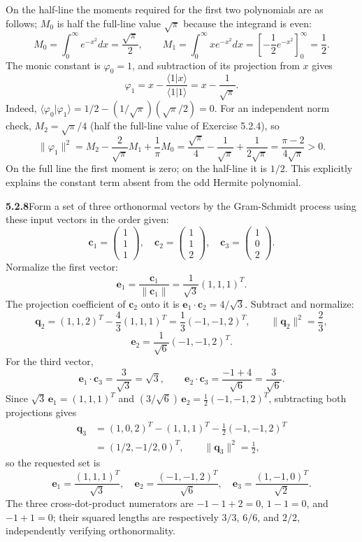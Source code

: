 On the half-line the moments required for the first two polynomials are
as follows; $M_0$ is half the full-line value $\sqrt\pi$ because the
integrand is even:
\[
M_0=\int_0^\infty e^{-x^2}dx=\frac{\sqrt\pi}{2},\qquad
M_1=\int_0^\infty xe^{-x^2}dx
=\left[-\frac12e^{-x^2}\right]_0^\infty=\frac12.
\]
The monic constant is $\varphi_0=1$, and subtraction of its projection
from $x$ gives
\[
\boxed{\varphi_1=x-\frac{\langle1|x\rangle}{\langle1|1\rangle}
=x-\frac1{\sqrt\pi}}.
\]
Indeed, $\langle\varphi_0|\varphi_1\rangle
=1/2-(1/\sqrt\pi)(\sqrt\pi/2)=0$.
For an independent norm check, $M_2=\sqrt\pi/4$ (half the full-line
value of Exercise 5.2.4), so
\[
\|\varphi_1\|^2=M_2-\frac2{\sqrt\pi}M_1+\frac1\pi M_0
=\frac{\sqrt\pi}4-\frac1{\sqrt\pi}+\frac1{2\sqrt\pi}
=\frac{\pi-2}{4\sqrt\pi}>0.
\]
On the full line the first moment is zero; on the half-line it is $1/2$.
This explicitly explains the constant term absent from the odd Hermite
polynomial.

\par\bigskip
\noindent\textbf{5.2.8}\quad Form a set of three orthonormal vectors by the
Gram-Schmidt process using these input vectors in the order given:
\[
\mathbf{c}_{1}=\begin{pmatrix}1\\1\\1\end{pmatrix},\quad
\mathbf{c}_{2}=\begin{pmatrix}1\\1\\2\end{pmatrix},\quad
\mathbf{c}_{3}=\begin{pmatrix}1\\0\\2\end{pmatrix}.
\]
\solution
Normalize the first vector:
\[
\mathbf e_1=\frac{\mathbf c_1}{\|\mathbf c_1\|}
=\frac1{\sqrt3}(1,1,1)^T.
\]
The projection coefficient of $\mathbf c_2$ onto it is
$\mathbf e_1\cdot\mathbf c_2=4/\sqrt3$. Subtract and normalize:
\[
\mathbf q_2=(1,1,2)^T-\frac43(1,1,1)^T
=\frac13(-1,-1,2)^T,\qquad \|\mathbf q_2\|^2=\frac23,
\]
\[
\mathbf e_2=\frac1{\sqrt6}(-1,-1,2)^T.
\]
For the third vector,
\[
\mathbf e_1\cdot\mathbf c_3=\frac3{\sqrt3}=\sqrt3,
\qquad
\mathbf e_2\cdot\mathbf c_3=\frac{-1+4}{\sqrt6}=\frac3{\sqrt6}.
\]
Since $\sqrt3\,\mathbf e_1=(1,1,1)^T$ and
$(3/\sqrt6)\,\mathbf e_2=\frac12(-1,-1,2)^T$, subtracting both
projections gives
\begin{align*}
\mathbf q_3&=(1,0,2)^T-(1,1,1)^T
 -\frac12(-1,-1,2)^T\\
&=(1/2,-1/2,0)^T,\qquad \|\mathbf q_3\|^2=\frac12,
\end{align*}
so the requested set is
\[
\boxed{\mathbf e_1=\frac{(1,1,1)^T}{\sqrt3},\quad
\mathbf e_2=\frac{(-1,-1,2)^T}{\sqrt6},\quad
\mathbf e_3=\frac{(1,-1,0)^T}{\sqrt2}}.
\]
The three cross-dot-product numerators are $-1-1+2=0$, $1-1=0$,
and $-1+1=0$; their squared lengths are respectively $3/3$, $6/6$,
and $2/2$, independently verifying orthonormality.

